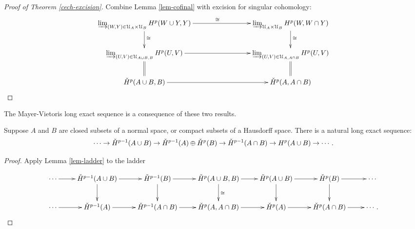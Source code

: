 \begin{proof}[Proof of Theorem \ref{cech-excision}]
Combine Lemma \ref{lem-cofinal} with excision for singular cohomology:
\begin{equation*}
\xymatrix{
\varinjlim_{(W,Y)\in\mathcal{U}_A\times\mathcal{U}_B}H^p(W\cup Y,Y)
\ar[rrr]^{\cong}\ar[d]^{\cong} & & & 
\varinjlim_{\mathcal{U}_A\times\mathcal{U}_B}H^p(W,W\cap Y)\ar[d]^{\cong}\\
\varinjlim_{(U,V)\in\mathcal{U}_{A\cup B,B}}H^p(U,V)\ar[rrr]\ar@{=}[d] & & & \varinjlim_{(U,V)\in\mathcal{U}_{A,A\cap B}}H^p(U,V)\ar@{=}[d]\\
	\cHH^p(A\cup B,B)\ar[rrr] & & & \cHH^p(A,A\cap B)
}\end{equation*}
\end{proof}
The Mayer-Vietoris long exact sequence is a consequence of these two
results.
\begin{corollary} 
\label{thm-cech-mayer-vietoris}
Suppose $A$ and $B$ are closed subsets of a normal space,
or compact subsets of a Hausdorff space. 
There is a natural long exact sequence: 
\[
\cdots\to\check{H}^{p-1}(A\cup B)\to\check{H}^{p-1}(A)\oplus\check{H}^p(B)\to
\check{H}^{p-1}(A\cap B)\to H^p(A\cup B)\to\cdots\,.
\]
\end{corollary}
\begin{proof}
Apply Lemma \ref{lem-ladder} to the ladder

\[
\xymatrix{
\cdots \ar[r] & \cHH^{p-1}(A\cup B) \ar[d] \ar[r] & 
\cHH^{p-1}(B) \ar[d] \ar[r] & \cHH^p(A\cup B,B) \ar[d]^\cong \ar[r] &
\cHH^p(A\cup B) \ar[d] \ar[r] & \cHH^p(B) \ar[d] \ar[r] & \cdots \\
\cdots \ar[r] & \cHH^{p-1}(A) \ar[r] & \cHH^{p-1}(A\cap B) \ar[r] & 
\cHH^p(A,A\cap B) \ar[r] & \cHH^p(A) \ar[r] & \cHH^p(A\cap B) \ar[r] & \cdots
\,.
}\]
\end{proof}
